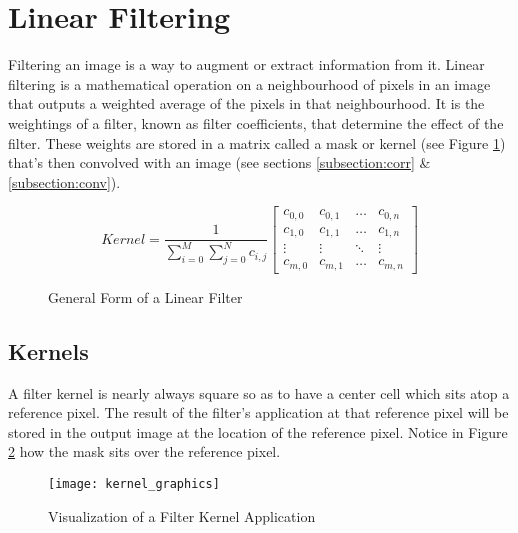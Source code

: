 \section{Linear Filtering}

Filtering an image is a way to augment or extract information from it. Linear filtering is a mathematical operation on a neighbourhood of pixels in an image that outputs a weighted average of the pixels in that neighbourhood. It is the weightings of a filter, known as filter coefficients, that determine the effect of the filter. These weights are stored in a matrix called a mask or kernel (see Figure \ref{fig:generalForm}) that's then convolved with an image (see sections \ref{subsection:corr} \& \ref{subsection:conv}).



\begin{figure}[h]
  
   \[ 
     Kernel  = \frac{1}{\sum\limits_{i=0}^{M}\sum\limits_{j=0}^{N}c_{i,j}}
    \begin{bmatrix}
      c_{0,0} & c_{0,1} & \dots & c_{0,n} \\
      c_{1,0} & c_{1,1} & \dots & c_{1,n} \\
      \vdots & \vdots & \ddots & \vdots \\
      c_{m,0} & c_{m,1} & \dots & c_{m,n}
    \end{bmatrix}
  \]
  \caption{General Form of a Linear Filter}
  \label{fig:generalForm}
\end{figure}




\subsection{Kernels}

 A filter kernel is nearly always square so as to have a center cell which sits atop a reference pixel. The result of the filter's application at that reference pixel will be stored in the output image at the location of the reference pixel. Notice in Figure \ref{fig:kernel_graphics} how the mask sits over the reference pixel.

\begin{figure}[H]
  \centering
  \centering\texttt{[image: kernel\_graphics]}
  \caption{Visualization of a Filter Kernel Application}
  \label{fig:kernel_graphics}
\end{figure}

